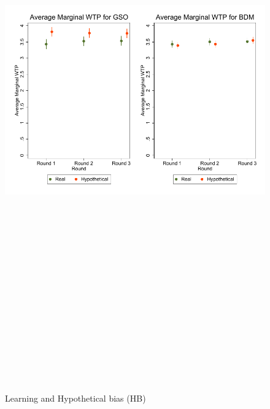 \documentclass[12pt]{article}
\begin{document}
\begin{figure}[H]
    \centering
     \includegraphics[width=15cm, height=25cm]{Hypo_bias_quarBDMvsGSO_graph.pdf}
    \caption{Learning and Hypothetical bias (HB)}
    \label{fig:Learning}
\end{figure}
\end{document}

